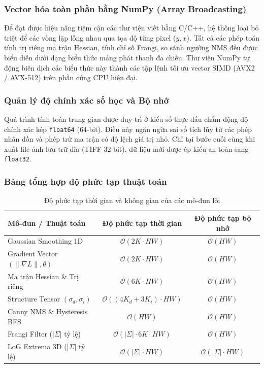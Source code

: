 \subsubsection{Vector hóa toàn phần bằng NumPy (Array Broadcasting)}
Để đạt được hiệu năng tiệm cận các thư viện viết bằng C/C++, hệ thống loại bỏ triệt để các vòng lặp lồng nhau qua tọa độ từng pixel ($y, x$). Tất cả các phép toán tính trị riêng ma trận Hessian, tính chỉ số Frangi, so sánh ngưỡng NMS đều được biểu diễn dưới dạng biểu thức mảng phát thanh đa chiều. Thư viện NumPy tự động biên dịch các biểu thức này thành các tập lệnh tối ưu vector SIMD (AVX2 / AVX-512) trên phần cứng CPU hiện đại.

\subsubsection{Quản lý độ chính xác số học và Bộ nhớ}
Quá trình tính toán trung gian được duy trì ở kiểu số thực dấu chấm động độ chính xác kép \texttt{float64} (64-bit). Điều này ngăn ngừa sai số tích lũy từ các phép nhân dồn và phép trừ ma trận có độ lệch giá trị nhỏ. Chỉ tại bước cuối cùng khi xuất file ảnh lưu trữ đĩa (TIFF 32-bit), dữ liệu mới được ép kiểu an toàn sang \texttt{float32}.

\subsubsection{Bảng tổng hợp độ phức tạp thuật toán}
\begin{table}[htbp]
\caption{Độ phức tạp thời gian và không gian của các mô-đun lõi}
\centering
\begin{tabular}{lcc}
\toprule
\textbf{Mô-đun / Thuật toán} & \textbf{Độ phức tạp thời gian} & \textbf{Độ phức tạp bộ nhớ} \\
\midrule
Gaussian Smoothing 1D & $\mathcal{O}(2K \cdot HW)$ & $\mathcal{O}(HW)$ \\
Gradient Vector $(\|\nabla L\|, \theta)$ & $\mathcal{O}(2K \cdot HW)$ & $\mathcal{O}(HW)$ \\
Ma trận Hessian \& Trị riêng & $\mathcal{O}(6K \cdot HW)$ & $\mathcal{O}(HW)$ \\
Structure Tensor $(\sigma_d, \sigma_i)$ & $\mathcal{O}((4K_d + 3K_i) \cdot HW)$ & $\mathcal{O}(HW)$ \\
Canny NMS \& Hysteresis BFS & $\mathcal{O}(HW)$ & $\mathcal{O}(HW)$ \\
Frangi Filter ($|\Sigma|$ tỷ lệ) & $\mathcal{O}(|\Sigma| \cdot 6K \cdot HW)$ & $\mathcal{O}(HW)$ \\
LoG Extrema 3D ($|\Sigma|$ tỷ lệ) & $\mathcal{O}(|\Sigma| \cdot HW)$ & $\mathcal{O}(|\Sigma| \cdot HW)$ \\
\bottomrule
\end{tabular}
\label{tab:complexity}
\end{table}
